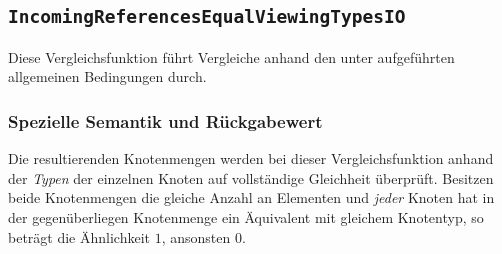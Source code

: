 \newpage
%
%
\subsection{\texttt{IncomingReferencesEqualViewingTypesIO}}
Diese Vergleichsfunktion führt Vergleiche anhand den unter\mylinebreak{} aufgeführten allgemeinen Bedingungen durch.

\subsubsection*{Spezielle Semantik und Rückgabewert}
Die resultierenden Knotenmengen werden bei dieser Vergleichsfunktion anhand der \emph{Typen} der einzelnen Knoten auf vollständige Gleichheit überprüft. Besitzen beide Knotenmengen die gleiche Anzahl an Elementen und \emph{jeder} Knoten hat in der gegenüberliegen Knotenmenge ein Äquivalent mit gleichem Knotentyp, so beträgt die Ähnlichkeit $1$, ansonsten $0$.
